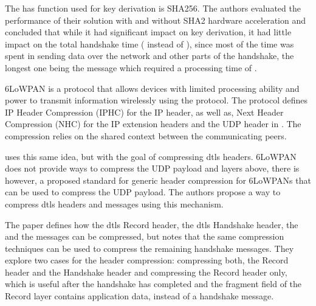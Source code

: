 \documentclass{llncs}
\begin{document}
{The has function used for key derivation is SHA256. The authors evaluated the
performance of their solution with and without SHA2 hardware acceleration and
concluded that while it had significant impact on key derivation, it had little
impact on the total handshake time ( instead of ), since most of the time was spent in sending
data over the network and other parts of the handshake, the longest one being
the  message which required a processing time
of .

6LoWPAN\cite{RFC4944} is a protocol that allows devices with limited processing
ability and power to transmit information wirelessly using the 
protocol. The protocol defines IP Header Compression (IPHC) for the IP header, as well as,
Next Header Compression (NHC) for the IP extension headers and the UDP header in \cite{RFC6282}.
The compression relies on the shared context between the communicating peers.

\cite{6LoWPANC53:online} uses this same idea, but with the goal of compressing \gls{dtls} headers.
6LoWPAN does not provide ways to compress the UDP payload and layers above, there
is however, a proposed standard\cite{RFC7400} for generic header compression
for 6LoWPANs that can be used to compress the UDP payload. The authors propose
a way to compress \gls{dtls} headers and messages using this mechanism.

The paper \cite{6LoWPANC53:online} defines how the \gls{dtls} Record header, the \gls{dtls} Handshake header,
the  and the  messages can be compressed, but notes that
the same compression techniques can be used to compress the remaining handshake
messages. They explore two cases for the header compression: compressing both,
the Record header and the Handshake header and compressing the Record header only,
which is useful after the handshake has completed and the fragment field of the
Record layer contains application data, instead of a handshake message.

}
\end{document}
